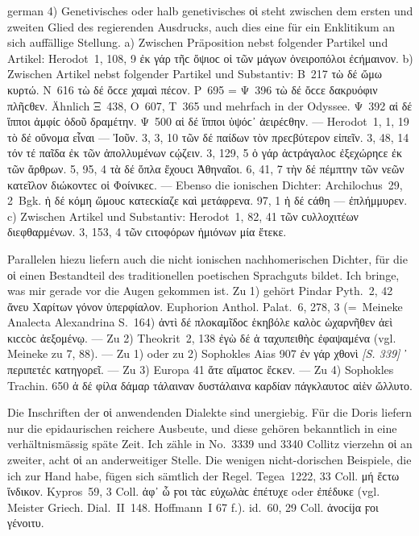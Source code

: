 \begin{otherlanguage*}{german}
4)	Genetivisches oder halb genetivisches οἱ steht zwischen dem ersten und zweiten Glied des regierenden Ausdrucks, auch dies eine für ein Enklitikum an sich auffällige Stellung. a) Zwischen Präposition nebst folgender Partikel und Artikel: Herodot~1, 108, 9 ἐκ γάρ  τῆϲ ὄψιοϲ οἱ τῶν μάγων ὀνειροπόλοι ἐϲήμαινον. b) Zwischen Artikel nebst folgender Partikel und Substantiv: Β~217 τὼ δέ  ὤμω κυρτώ. Ν~616 τὼ δέ  ὄϲϲε χαμαὶ πέϲον. Ρ~695 = Ψ~396 τὼ δέ  ὄϲϲε δακρυόφιν πλῆϲθεν. Ähnlich Ξ~438, Ο~607, Τ~365 und mehrfach in der Odyssee. Ψ~392 αἱ δέ  ἵπποι ἀμφίϲ ὁδοῦ δραμέτην. Ψ~500 αἱ δέ  ἵπποι ὑψόϲ᾽ ἀειρέϲθην. — Herodot~1, 1, 19 τὸ δέ  οὔνομα εἶναι — Ἰοῦν. 3, 3, 10 τῶν δέ  παίδων τὸν πρεϲβύτερον εἰπεῖν. 3, 48, 14 τόν τέ  παῖδα ἐκ τῶν ἀπολλυμένων ϲῴζειν. 3, 129, 5 ὁ γάρ  ἀϲτράγαλοϲ ἐξεχώρηϲε ἐκ τῶν ἄρθρων. 5, 95, 4 τὰ δέ  ὅπλα ἔχουϲι Ἀθηναῖοι. 6, 41, 7 τὴν δέ  πέμπτην τῶν νεῶν κατεῖλον διώκοντεϲ οἱ Φοίνικεϲ. — Ebenso die ionischen Dichter: Archilochus~29, 2~Bgk. ἡ δέ  κόμη ὤμουϲ κατεϲκίαζε καὶ μετάφρενα. 97, 1 ἡ δέ  ϲάθη — ἐπλήμμυρεν. c) Zwischen Artikel und Substantiv: Herodot~1, 82, 41 τῶν  ϲυλλοχιτέων διεφθαρμένων. 3, 153, 4 τῶν  ϲιτοφόρων ἡμιόνων μία ἔτεκε.

Parallelen hiezu liefern auch die nicht ionischen nachhomerischen Dichter, für die οἱ einen Bestandteil des traditionellen poetischen Sprachguts bildet. Ich bringe, was mir gerade vor die Augen gekommen ist. Zu 1) gehört Pindar Pyth.~2, 42 ἄνευ  Χαρίτων  γόνον ὑπερφίαλον. Euphorion Anthol. Palat.~6, 278, 3 (=~Meineke Analecta Alexandrina S.~164) ἀντὶ δέ  πλοκαμῖδοϲ ἑκηβόλε καλὸϲ  ὡχαρνῆθεν ἀεὶ κιϲϲὸϲ ἀεξομένῳ. — Zu 2) Theokrit~2, 138 ἐγὼ δέ  ἁ ταχυπειθὴϲ  ἐφαψαμένα (vgl. Meineke zu 7, 88). — Zu 1) oder zu 2) Sophokles Aias 907 ἐν γάρ  χθονὶ  \hypertarget{p339}{\emph{[S. 339]}}\label{p339} ᾽  περιπετέϲ κατηγορεῖ. — Zu 3) Europa 41 ἅτε  αἵματοϲ ἔϲκεν. — Zu 4) Sophokles Trachin. 650 ἁ δέ  φίλα δάμαρ τάλαιναν δυστάλαινα καρδίαν πάγκλαυτοϲ αἰὲν ὤλλυτο.

Die Inschriften der οἱ anwendenden Dialekte sind unergiebig. Für die Doris liefern nur die epidaurischen reichere Ausbeute, und diese gehören bekanntlich in eine verhältnismässig späte Zeit. Ich zähle in No.~3339 und 3340 Collitz vierzehn οἱ an zweiter, acht οἱ an anderweitiger Stelle. Die wenigen nicht-dorischen Beispiele, die ich zur Hand habe, fügen sich sämtlich der Regel. Tegea~1222, 33 Coll. μή  ἔϲτω ἴνδικον. Kypros~59, 3 Coll. ἀφ᾽ ὧ ϝοι τὰϲ εὐχωλὰϲ ἐπέτυχε oder ἐπέδυκε (vgl. Meister Griech. Dial.~II~148. Hoffmann~I 67 f.). id.~60, 29 Coll. ἀνοϲίϳα ϝοι γένοιτυ.


\end{otherlanguage*}
